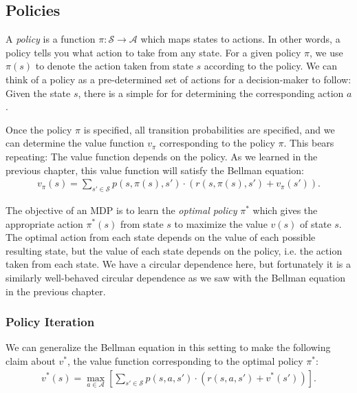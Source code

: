 \documentclass{article}
\begin{document}
    \subsection{\sc Policies}

      A {\it policy} is a function $\pi : \mathcal{S} \rightarrow \mathcal{A}$ which maps states to actions. In other words, a policy tells you what action to take from any state. For a given policy $\pi$, we use $\pi(s)$ to denote the action taken from state $s$ according to the policy. We can think of a policy as a pre-determined set of actions for a decision-maker to follow: Given the state $s$, there is a simple for for determining the corresponding action $a$.

      Once the policy $\pi$ is specified, all transition probabilities are specified, and we can determine the value function $v_\pi$ corresponding to the policy $\pi$. This bears repeating: The value function depends on the policy. As we learned in the previous chapter, this value function will satisfy the Bellman equation:
      \begin{align*}
        v_\pi(s) = \sum_{s' \in \mathcal{S}} p(s, \pi(s), s') \cdot (r(s, \pi(s), s') + v_\pi(s')).
      \end{align*}
      
      The objective of an MDP is to learn the {\it optimal policy} $\pi^*$ which gives the appropriate action $\pi^*(s)$ from state $s$ to maximize the value $v(s)$ of state $s$. The optimal action from each state depends on the value of each possible resulting state, but the value of each state depends on the policy, i.e. the action taken from each state. We have a circular dependence here, but fortunately it is a similarly well-behaved circular dependence as we saw with the Bellman equation in the previous chapter.

      \subsubsection{\sc Policy Iteration}

        We can generalize the Bellman equation in this setting to make the following claim about $v^*$, the value function corresponding to the optimal policy $\pi^*$:
        \begin{align}
          \label{eqn:bellman-equation}
          v^*(s) = \max_{a \in \mathcal{A}} \left[\sum_{s' \in \mathcal{S}} p(s, a, s') \cdot (r(s, a, s') + v^*(s'))\right].
        \end{align}
\end{document}
